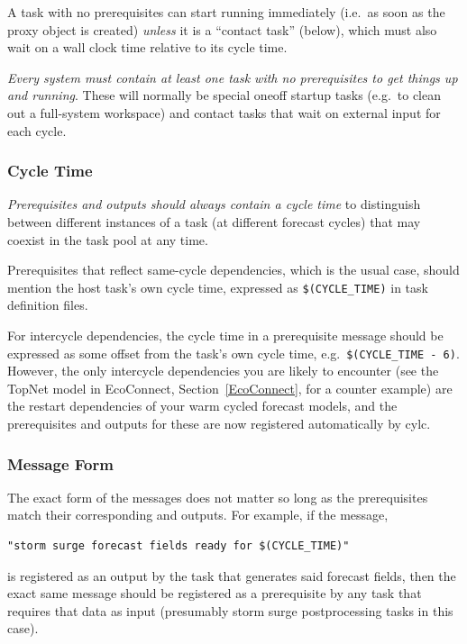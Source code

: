 \documentclass[11pt,a4paper]{article}
\begin{document}
A task with no prerequisites can start running immediately (i.e.\ as soon
as the proxy object is created) {\em unless} it is a ``contact task''
(below), which must also wait on a wall clock time relative to its cycle time.

{\em Every system must contain at least one task with no prerequisites
to get things up and running}. These will normally be special oneoff
startup tasks (e.g.\ to clean out a full-system workspace) and contact
tasks that wait on external input for each cycle.


\lstset{language=cylctaskdef} 

\subsubsection{Cycle Time}

{\em Prerequisites and outputs should always contain a cycle time} to
distinguish between different instances of a task (at different 
forecast cycles) that may coexist in the task pool at any time. 

Prerequisites that reflect same-cycle dependencies, which is the usual
case, should mention the host task's own cycle time, expressed as
\lstinline=$(CYCLE_TIME)= in task definition files.

For intercycle dependencies, the cycle time in a prerequisite message
should be expressed as some offset from the task's own cycle time, e.g.\
\lstinline=$(CYCLE_TIME - 6)=. However, the only intercycle dependencies
you are likely to encounter (see the TopNet model in EcoConnect,
Section~\ref{EcoConnect}, for a counter example) are the restart
dependencies of your warm cycled forecast models, and the prerequisites
and outputs for these are now registered automatically by cylc.

\subsubsection{Message Form}

The exact form of the messages does not matter so long as the
prerequisites match their corresponding and outputs. For example, if
the message, 
\begin{lstlisting}
"storm surge forecast fields ready for $(CYCLE_TIME)"
\end{lstlisting} 
is registered as an output by the task that generates said forecast
fields, then the exact same message should be registered as a
prerequisite by any task that requires that data as input
(presumably storm surge postprocessing tasks in this case). 
\end{document}
